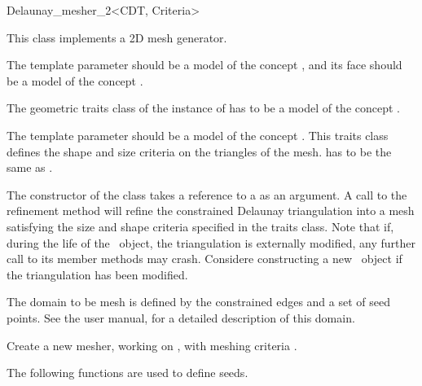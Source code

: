 \begin{ccRefClass}{Delaunay_mesher_2<CDT, Criteria>}

This class implements a 2D mesh generator.

\ccParameters
The template parameter  should be a model of the concept
, and its face should be a model of
the concept .

The geometric traits class of the instance of  has to be
a model of the concept .

The template parameter  should be a model of the concept
. This traits class defines the shape and size
criteria on the triangles of the mesh.  has to
be the same as .


The constructor of the class \ccRefName{} takes a reference to a 
as an argument. A call to the refinement method  will
refine the constrained Delaunay triangulation into a mesh satisfying the
size and shape criteria specified in the traits class. Note that if, during
the life of the \ccRefName\ object, the triangulation is externally
modified, any further call to its member methods may crash. Considere
constructing a new \ccRefName\ object if the triangulation has been
modified.

The domain to be mesh is defined by the constrained edges and a set
of seed points. See the user manual, for a detailed description of this
domain.


\ccTypes 
{}

\ccCreation
{}

{Create a new mesher, working on , with meshing criteria
  .}


The following functions are used to define seeds.



\end{ccRefClass}
